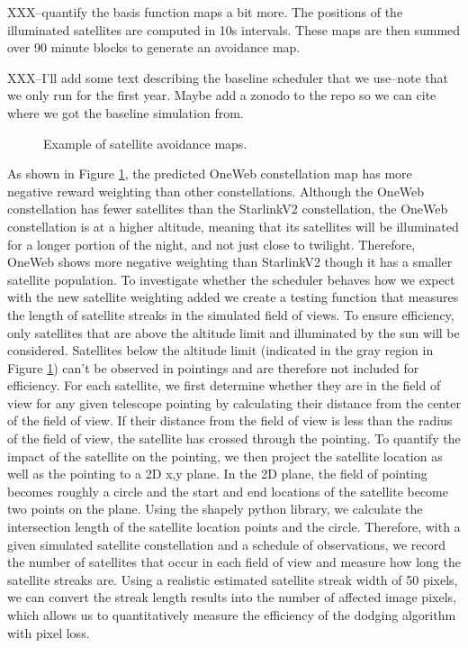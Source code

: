\documentclass[linenumbers]{aastex631}
\begin{document}
XXX--quantify the basis function maps a bit more. The positions of the illuminated satellites are computed in 10s intervals. These maps are then summed over 90 minute blocks to generate an avoidance map. 

XXX--I'll add some text describing the baseline scheduler that we use--note that we only run for the first year. Maybe add a zonodo to the repo so we can cite where we got the baseline simulation from.

\begin{figure}[ht!]
\caption{Example of satellite avoidance maps. \label{fig-simulated-scheduler}}
\end{figure}

As shown in Figure \ref{fig-simulated-scheduler}, the predicted OneWeb constellation map has more negative reward
weighting than other constellations. Although the OneWeb constellation has fewer satellites than
the StarlinkV2 constellation, the OneWeb constellation is at a higher altitude, meaning that its
satellites will be illuminated for a longer portion of the night, and not just close to twilight.
Therefore, OneWeb shows more negative weighting than StarlinkV2 though it has a smaller
satellite population.
To investigate whether the scheduler behaves how we expect with the new satellite
weighting added we create a testing function that measures the length of satellite streaks in the
simulated field of views. To ensure efficiency, only satellites that are above the altitude limit and
illuminated by the sun will be considered. Satellites below the altitude limit (indicated in the gray
region in Figure \ref{fig-simulated-scheduler}) can’t be observed in pointings and are therefore not included for efficiency.
For each satellite, we first determine whether they are in the field of view for any given
telescope pointing by calculating their distance from the center of the field of view. If their
distance from the field of view is less than the radius of the field of view, the satellite has crossed
through the pointing. To quantify the impact of the satellite on the pointing, we then project the satellite location as well as the pointing to a 2D x,y plane. In the 2D plane, the field of pointing
becomes roughly a circle and the start and end locations of the satellite become two points on the
plane. Using the shapely python library, we calculate the intersection length of the satellite location
points and the circle.
Therefore, with a given simulated satellite constellation and a schedule of observations,
we record the number of satellites that occur in each field of view and measure how long the
satellite streaks are. Using a realistic estimated satellite streak width of 50 pixels, we can convert
the streak length results into the number of affected image pixels, which allows us to
quantitatively measure the efficiency of the dodging algorithm with pixel loss. 
\end{document}
